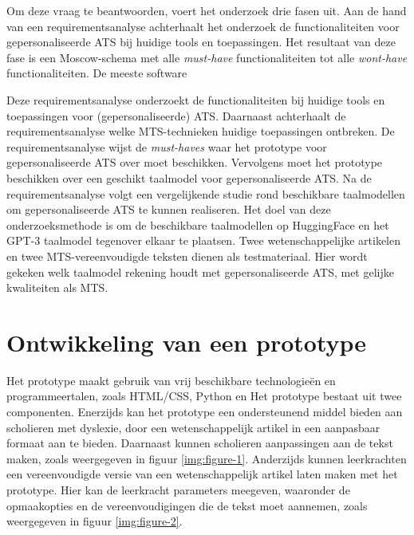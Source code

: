 \documentclass[a0,portrait]{hogent-poster}
\begin{document}
\begin{multicols}{2}
Om deze vraag te beantwoorden, voert het onderzoek drie fasen uit. Aan de hand van een requirementsanalyse achterhaalt het onderzoek de functionaliteiten voor gepersonaliseerde ATS bij huidige tools en toepassingen. Het resultaat van deze fase is een Moscow-schema met alle \textit{must-have} functionaliteiten tot alle \textit{wont-have} functionaliteiten. De meeste software 


Deze requirementsanalyse onderzoekt de functionaliteiten bij huidige tools en toepassingen voor (gepersonaliseerde) ATS. Daarnaast achterhaalt de requirementsanalyse welke MTS-technieken huidige toepassingen ontbreken. De requirementsanalyse wijst de \textit{must-haves} waar het prototype voor gepersonaliseerde ATS over moet beschikken. Vervolgens moet het prototype beschikken over een geschikt taalmodel voor gepersonaliseerde ATS. Na de requirementsanalyse volgt een vergelijkende studie rond beschikbare taalmodellen om gepersonaliseerde ATS te kunnen realiseren. Het doel van deze onderzoeksmethode is om de beschikbare taalmodellen op HuggingFace en het GPT-3 taalmodel tegenover elkaar te plaatsen. Twee wetenschappelijke artikelen en twee MTS-vereenvoudigde teksten dienen als testmateriaal. Hier wordt gekeken welk taalmodel rekening houdt met gepersonaliseerde ATS, met gelijke kwaliteiten als MTS.

\section{Ontwikkeling van een prototype}

Het prototype maakt gebruik van vrij beschikbare technologieën en programmeertalen, zoals HTML/CSS, Python en Het prototype bestaat uit twee componenten. Enerzijds kan het prototype een ondersteunend middel bieden aan scholieren met dyslexie, door een wetenschappelijk artikel in een aanpasbaar formaat aan te bieden. Daarnaast kunnen scholieren aanpassingen aan de tekst maken, zoals weergegeven in figuur \ref{img:figure-1}. Anderzijds kunnen leerkrachten een vereenvoudigde versie van een wetenschappelijk artikel laten maken met het prototype. Hier kan de leerkracht parameters meegeven, waaronder de opmaakopties en de vereenvoudigingen die de tekst moet aannemen, zoals weergegeven in figuur \ref{img:figure-2}.


\end{multicols}
\end{document}
